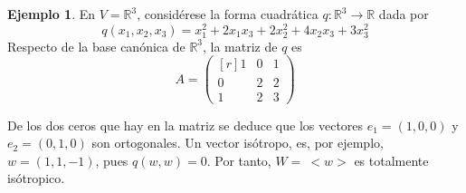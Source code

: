 \documentclass[12pt]{report}
\theoremstyle{definition}
\theoremstyle{definition}
\newtheorem{example}{Ejemplo}[chapter]
\theoremstyle{remark}
\newcommand{\R}{\mathbb R}
\begin{document}
\begin{example}
En $V = \R^3$, considérese la forma cuadrática $q \colon \R^3 \to \R$ dada por
\[q(x_1,x_2,x_3) = x_1^2+2x_1x_3+2x_2^2+4x_2x_3+3x_3^2\]
Respecto de la base canónica de $\R^3$, la matriz de $q$ es
\[A = \begin{pmatrix*}[r]
    1 & 0 & 1 \\
    0 & 2 & 2 \\
    1 & 2 & 3
\end{pmatrix*}\]

\vspace{2mm}
\noindent De los dos ceros que hay en la matriz se deduce que los vectores $e_1 = (1,0,0)$ y $e_2 = (0,1,0)$ son ortogonales. Un vector isótropo, es, por ejemplo, $w = (1,1,-1)$, pues $q(w,w) = 0$. Por tanto, $W = \ < w>$ es totalmente isótropico.


\end{example}
\end{document}
